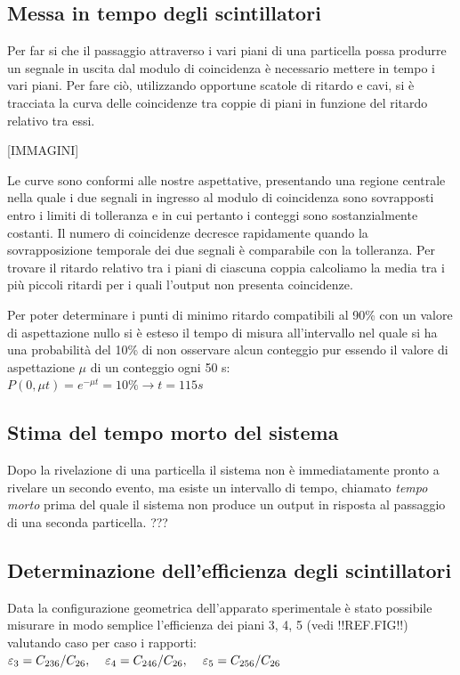 \documentclass[11pt]{article}
\begin{document}
\subsection{Messa in tempo degli scintillatori} \label{subsec:sync}

Per far si che il passaggio attraverso i vari piani di una particella possa produrre un segnale in uscita dal modulo di coincidenza è necessario mettere in tempo i vari piani. Per fare ciò, utilizzando opportune scatole di ritardo e cavi, si è tracciata la curva delle coincidenze tra coppie di piani in funzione del ritardo relativo tra essi.

[IMMAGINI]

Le curve sono conformi alle nostre aspettative, presentando una regione centrale nella quale i due segnali in ingresso al modulo di coincidenza sono sovrapposti entro i limiti di tolleranza e in cui pertanto i conteggi sono sostanzialmente costanti. 
Il numero di coincidenze decresce rapidamente quando la sovrapposizione temporale dei due segnali è comparabile con la tolleranza. Per trovare il ritardo relativo tra i piani di ciascuna coppia calcoliamo la media tra i più piccoli ritardi per i quali l'output non presenta coincidenze.

Per poter determinare i punti di minimo ritardo compatibili al 90\% con un valore di
aspettazione nullo si è esteso il tempo di misura all’intervallo nel quale si ha una probabilità del 10\% di non
osservare alcun conteggio pur essendo il valore di aspettazione $\mu$ di un conteggio ogni 50 s: \\

$
P(0, \mu t) = e^{−\mu t} = 10\% → t = 115 s
$

\subsection{Stima del tempo morto del sistema}
Dopo la rivelazione di una particella il sistema non è immediatamente pronto a rivelare un secondo evento, ma esiste un intervallo di tempo, chiamato \textit{tempo morto} prima del quale il sistema non produce un output in risposta al passaggio di una seconda particella. 
???
\subsection{Determinazione dell'efficienza degli scintillatori} \label{subsec:efficienza}
Data la configurazione geometrica dell'apparato sperimentale è stato possibile misurare in modo semplice l'efficienza dei piani 3, 4, 5 (vedi !!REF.FIG!!) valutando caso per caso i rapporti: \\
$
\varepsilon_3 = C_{236}/C_{26}, \hspace{0.4 cm} \varepsilon_4 = C_{246}/C_{26}, \hspace{0.4 cm} \varepsilon_5 = C_{256}/C_{26}
$
\end{document}
